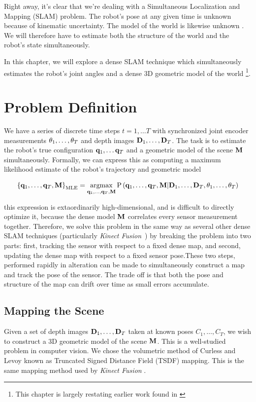 Right away, it's clear that we're dealing with a Simultaneous Localization and Mapping (SLAM) problem. The robot's pose at any given time is unknown because of kinematic uncertainty. The model of the world is likewise unknown \apriori. We will therefore have to estimate both the structure of the world and the robot's state simultaneously.

In this chapter, we will explore a dense SLAM technique which simultaneously estimates the robot's joint angles and a dense 3D geometric model of the world \footnote{This chapter is largely restating earlier work found in \cite{Klingensmith2016}}.

\section{Problem Definition}
We have a series of discrete time steps $t = 1, \ldots T$ with synchronized joint encoder measurements $\theta_1, \ldots, \theta_T$ and depth images $\mathbf{D}_1, \ldots, \mathbf{D}_T$. The task is to estimate the robot's true configuration $\mathbf{q}_1, \ldots \mathbf{q}_T$ and a geometric model of the scene $\mathbf{M}$ simultaneously. Formally, we can express this as computing a maximum likelihood estimate of the robot's trajectory and geometric model

\begin{equation}
	\left\{\config_1, \ldots, \config_T, \DenseMap\right\}_{\text{MLE}} = \argmax_{\config_1, \ldots, \config_T, \DenseMap} \Prob\left(\config_1, \ldots, \config_T, \DenseMap | \DepthImage_1, \ldots, \DepthImage_T, \enc_1, \ldots, \enc_T\right)
\end{equation}

\noindent this expression is extaordinarily high-dimensional, and is difficult to directly optimize it, because the dense model $\mathbf{M}$ correlates every sensor measurement together. Therefore, we solve this problem in the same way as several other dense SLAM techniques (particularly \textit{Kinect Fusion}~\cite{KinectFusion}) by breaking the problem into two parts: first, tracking the sensor with respect to a fixed dense map, and second, updating the dense map with respect to a fixed sensor pose.These two steps, performed rapidly in alteration can be made to simultaneously construct a map and track the pose of the sensor. The trade off is that both the pose and structure of the map can drift over time as small errors accumulate.

\subsection{Mapping the Scene}
Given a set of depth images $\mathbf{D}_1, \ldots, \mathbf{D}_T$ taken at known poses $C_1, \ldots, C_T$, we wish to construct a 3D geometric model of the scene $\mathbf{M}$. This is a well-studied problem in computer vision. We chose the volumetric method of Curless and Levoy \cite{Curless1996} known as Truncated Signed Distance Field (TSDF) mapping. This is the same mapping method used by \textit{Kinect Fusion} \cite{KinectFusion}.

